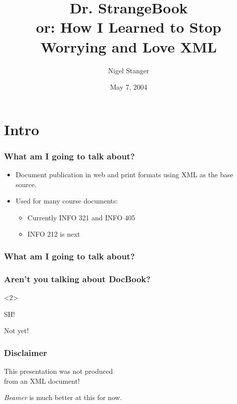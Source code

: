 \documentclass[pdftex]{beamer}
\author{Nigel Stanger}
\title{Dr. StrangeBook \\ \footnotesize or: How I Learned to Stop Worrying and Love XML}
\institute{Department of Information Science}
\date{May 7, 2004}
\begin{document}
\frame{\titlepage}


\section*{Intro}


\frame
{
	\frametitle{What am I going to talk about?}
	
	\begin{itemize}
	
		\item Document publication in web and print formats using XML
		as the base source.
		
		\item Used for many course documents:
		
		\begin{itemize}
		
			\item Currently INFO 321 and INFO 405
			
			\item INFO 212 is next
			
		\end{itemize}
	
	\end{itemize}
}


\frame
{
	\frametitle{What am I going to talk about?}
	
	\tableofcontents
}


\frame
{
	\frametitle{Aren't you talking about DocBook?}
	
	
	\begin{center}
	
		\begin{uncoverenv}<2>

			{\Huge\alert{SH!}}
			
			\vspace*{1cm}
		
			Not yet!
		
		\end{uncoverenv}
	
	\end{center}	
}


\frame
{
	\frametitle{Disclaimer}
	
	\begin{center}
	
		{\LARGE\alert{This presentation was not produced \\
		from an XML document!}}
		
		\vspace*{1cm}
		
		\emph{Beamer} is much better at this for now.
	
	\end{center}
}
\end{document}
